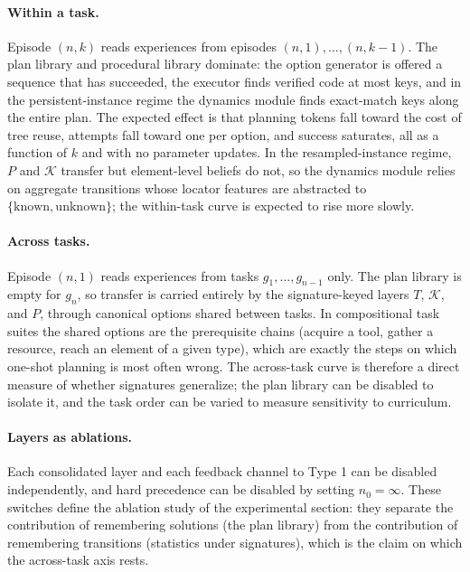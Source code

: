 \documentclass[11pt]{article}
\begin{document}
\paragraph{Within a task.}
Episode $(n,k)$ reads experiences from episodes $(n,1),\dots,(n,k-1)$. The plan library and procedural library dominate: the option generator is offered a sequence that has succeeded, the executor finds verified code at most keys, and in the persistent-instance regime the dynamics module finds exact-match keys along the entire plan. The expected effect is that planning tokens fall toward the cost of tree reuse, attempts fall toward one per option, and success saturates, all as a function of $k$ and with no parameter updates. In the resampled-instance regime, $P$ and $\mathcal{K}$ transfer but element-level beliefs do not, so the dynamics module relies on aggregate transitions whose locator features are abstracted to $\{\mathrm{known},\mathrm{unknown}\}$; the within-task curve is expected to rise more slowly.

\paragraph{Across tasks.}
Episode $(n,1)$ reads experiences from tasks $g_1,\dots,g_{n-1}$ only. The plan library is empty for $g_n$, so transfer is carried entirely by the signature-keyed layers $T$, $\mathcal{K}$, and $P$, through canonical options shared between tasks. In compositional task suites the shared options are the prerequisite chains (acquire a tool, gather a resource, reach an element of a given type), which are exactly the steps on which one-shot planning is most often wrong. The across-task curve is therefore a direct measure of whether signatures generalize; the plan library can be disabled to isolate it, and the task order can be varied to measure sensitivity to curriculum.

\paragraph{Layers as ablations.}
Each consolidated layer and each feedback channel to Type 1 can be disabled independently, and hard precedence can be disabled by setting $n_0=\infty$. These switches define the ablation study of the experimental section: they separate the contribution of remembering solutions (the plan library) from the contribution of remembering transitions (statistics under signatures), which is the claim on which the across-task axis rests.
\end{document}
